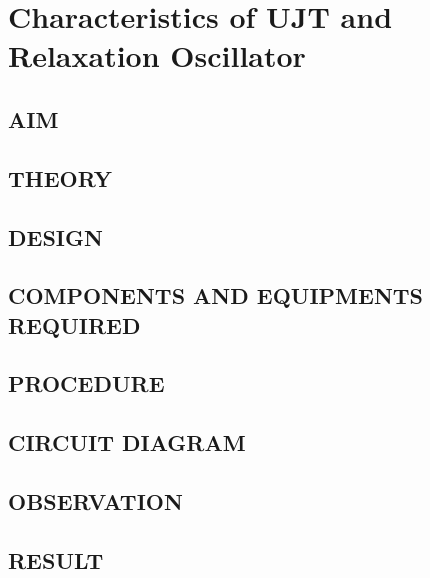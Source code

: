 \chapter[Characteristics of UJT and Relaxation Oscillator]{Characteristics of UJT and Relaxation Oscillator}
\section*[AIM]{AIM}
\section*[THEORY]{THEORY}
\section*[DESIGN]{DESIGN}
\section*[COMPONENTS AND EQUIPMENTS REQUIRED]{COMPONENTS AND EQUIPMENTS REQUIRED}
\section*[PROCEDURE]{PROCEDURE}
\section*[CIRCUIT DIAGRAM]{CIRCUIT DIAGRAM}
\section*[OBSERVATION]{OBSERVATION}
\section*[RESULT]{RESULT}
